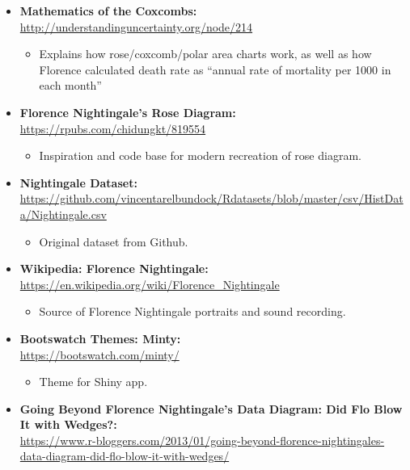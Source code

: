 \documentclass[
  dvipsnames]{article}
\providecommand{\tightlist}{%
  \setlength{\itemsep}{0pt}\setlength{\parskip}{0pt}}
\begin{document}
\begin{itemize}
\tightlist
\item
  \textbf{Mathematics of the Coxcombs:}\\
  \url{http://understandinguncertainty.org/node/214}

  \begin{itemize}
  \tightlist
  \item
    Explains how rose/coxcomb/polar area charts work, as well as how
    Florence calculated death rate as ``annual rate of mortality per
    1000 in each month''
  \end{itemize}
\item
  \textbf{Florence Nightingale's Rose Diagram:}\\
  \url{https://rpubs.com/chidungkt/819554}

  \begin{itemize}
  \tightlist
  \item
    Inspiration and code base for modern recreation of rose diagram.
  \end{itemize}
\item
  \textbf{Nightingale Dataset:}\\
  \url{https://github.com/vincentarelbundock/Rdatasets/blob/master/csv/HistData/Nightingale.csv}

  \begin{itemize}
  \tightlist
  \item
    Original dataset from Github.
  \end{itemize}
\item
  \textbf{Wikipedia: Florence Nightingale:}\\
  \url{https://en.wikipedia.org/wiki/Florence_Nightingale}

  \begin{itemize}
  \tightlist
  \item
    Source of Florence Nightingale portraits and sound recording.
  \end{itemize}
\item
  \textbf{Bootswatch Themes: Minty:}\\
  \url{https://bootswatch.com/minty/}

  \begin{itemize}
  \tightlist
  \item
    Theme for Shiny app.
  \end{itemize}
\item
  \textbf{Going Beyond Florence Nightingale's Data Diagram: Did Flo Blow
  It with Wedges?:}\\
  \url{https://www.r-bloggers.com/2013/01/going-beyond-florence-nightingales-data-diagram-did-flo-blow-it-with-wedges/}


\end{itemize}
\end{document}
